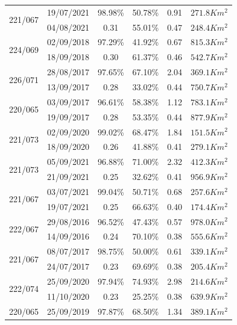 \documentclass[cic,tc]{iiufrgs}
\begin{document}
\begin{table}[htbp]
\begin{tabular}{cccccl}
\hline
\multirow{2}{*}{221/067} & 19/07/2021 & 98.98\% & 50.78\% & 0.91 & $271.8Km^2$ \\
                         & 04/08/2021 & 0.31 & 55.01\% & 0.47 & $248.4Km^2$ \\
\hline
\multirow{2}{*}{224/069} & 02/09/2018 & 97.29\% & 41.92\% & 0.67 & $815.3Km^2$ \\
                         & 18/09/2018 & 0.30 & 61.37\% & 0.46 & $542.7Km^2$ \\
\hline
\multirow{2}{*}{226/071} & 28/08/2017 & 97.65\% & 67.10\% & 2.04 & $369.1Km^2$ \\
                         & 13/09/2017 & 0.28 & 33.02\% & 0.44 & $750.7Km^2$ \\
\hline
\multirow{2}{*}{220/065} & 03/09/2017 & 96.61\% & 58.38\% & 1.12 & $783.1Km^2$ \\
                         & 19/09/2017 & 0.28 & 53.35\% & 0.44 & $877.9Km^2$ \\
\hline
\multirow{2}{*}{221/073} & 02/09/2020 & 99.02\% & 68.47\% & 1.84 & $151.5Km^2$ \\
                         & 18/09/2020 & 0.26 & 41.88\% & 0.41 & $279.1Km^2$ \\
\hline
\multirow{2}{*}{221/073} & 05/09/2021 & 96.88\% & 71.00\% & 2.32 & $412.3Km^2$ \\
                         & 21/09/2021 & 0.25 & 32.62\% & 0.41 & $956.9Km^2$ \\
\hline
\multirow{2}{*}{221/067} & 03/07/2021 & 99.04\% & 50.71\% & 0.68 & $257.6Km^2$ \\
                         & 19/07/2021 & 0.25 & 66.63\% & 0.40 & $174.4Km^2$ \\
\hline
\multirow{2}{*}{222/067} & 29/08/2016 & 96.52\% & 47.43\% & 0.57 & $978.0Km^2$ \\
                         & 14/09/2016 & 0.24 & 70.10\% & 0.38 & $555.6Km^2$ \\
\hline
\multirow{2}{*}{221/067} & 08/07/2017 & 98.75\% & 50.00\% & 0.61 & $339.1Km^2$ \\
                         & 24/07/2017 & 0.23 & 69.69\% & 0.38 & $205.4Km^2$ \\
\hline
\multirow{2}{*}{222/074} & 25/09/2020 & 97.94\% & 74.93\% & 2.98 & $214.6Km^2$ \\
                         & 11/10/2020 & 0.23 & 25.25\% & 0.38 & $639.9Km^2$ \\
\hline
\multirow{2}{*}{220/065} & 25/09/2019 & 97.87\% & 68.50\% & 1.34 & $389.1Km^2$ \\

\end{tabular}
\end{table}
\end{document}

